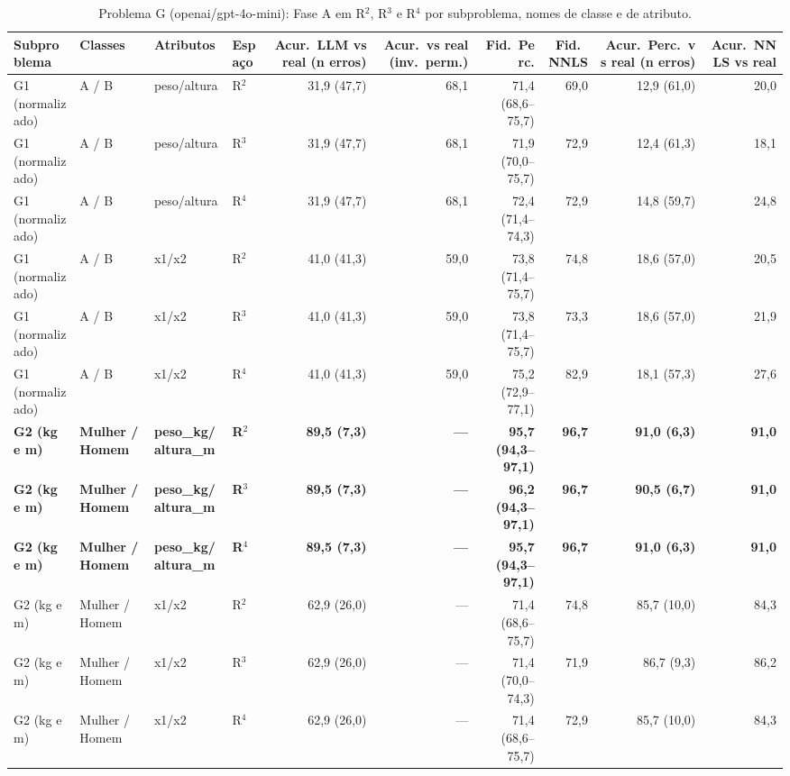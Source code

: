 \begin{table}[htbp]
\centering
\footnotesize
\caption{Problema G (openai/gpt-4o-mini): Fase A em R$^2$, R$^3$ e R$^4$ por subproblema, nomes de classe e de atributo.}
\label{tab:bloco3_G_faseA_R2_R3_R4_gpt4mini}
\begin{tabular}{llllrrrrrr}
\toprule
Subproblema & Classes & Atributos & Espaço & Acur.\ LLM vs real (n erros) & Acur.\ vs real (inv.\ perm.) & Fid.\ Perc. & Fid.\ NNLS & Acur.\ Perc.\ vs real (n erros) & Acur.\ NNLS vs real \\
\midrule
G1 (normalizado) & A / B & peso/altura & R$^2$ & 31,9 (47,7) & 68,1 & 71,4 (68,6–75,7) & 69,0 & 12,9 (61,0) & 20,0 \\
G1 (normalizado) & A / B & peso/altura & R$^3$ & 31,9 (47,7) & 68,1 & 71,9 (70,0–75,7) & 72,9 & 12,4 (61,3) & 18,1 \\
G1 (normalizado) & A / B & peso/altura & R$^4$ & 31,9 (47,7) & 68,1 & 72,4 (71,4–74,3) & 72,9 & 14,8 (59,7) & 24,8 \\
\midrule
G1 (normalizado) & A / B & x1/x2 & R$^2$ & 41,0 (41,3) & 59,0 & 73,8 (71,4–75,7) & 74,8 & 18,6 (57,0) & 20,5 \\
G1 (normalizado) & A / B & x1/x2 & R$^3$ & 41,0 (41,3) & 59,0 & 73,8 (71,4–75,7) & 73,3 & 18,6 (57,0) & 21,9 \\
G1 (normalizado) & A / B & x1/x2 & R$^4$ & 41,0 (41,3) & 59,0 & 75,2 (72,9–77,1) & 82,9 & 18,1 (57,3) & 27,6 \\
\midrule
\textbf{G2 (kg e m)} & \textbf{Mulher / Homem} & \textbf{peso\_kg/altura\_m} & \textbf{R$^2$} & \textbf{89,5 (7,3)} & \textbf{—} & \textbf{95,7 (94,3–97,1)} & \textbf{96,7} & \textbf{91,0 (6,3)} & \textbf{91,0} \\
\textbf{G2 (kg e m)} & \textbf{Mulher / Homem} & \textbf{peso\_kg/altura\_m} & \textbf{R$^3$} & \textbf{89,5 (7,3)} & \textbf{—} & \textbf{96,2 (94,3–97,1)} & \textbf{96,7} & \textbf{90,5 (6,7)} & \textbf{91,0} \\
\textbf{G2 (kg e m)} & \textbf{Mulher / Homem} & \textbf{peso\_kg/altura\_m} & \textbf{R$^4$} & \textbf{89,5 (7,3)} & \textbf{—} & \textbf{95,7 (94,3–97,1)} & \textbf{96,7} & \textbf{91,0 (6,3)} & \textbf{91,0} \\
\midrule
G2 (kg e m) & Mulher / Homem & x1/x2 & R$^2$ & 62,9 (26,0) & — & 71,4 (68,6–75,7) & 74,8 & 85,7 (10,0) & 84,3 \\
G2 (kg e m) & Mulher / Homem & x1/x2 & R$^3$ & 62,9 (26,0) & — & 71,4 (70,0–74,3) & 71,9 & 86,7 (9,3) & 86,2 \\
G2 (kg e m) & Mulher / Homem & x1/x2 & R$^4$ & 62,9 (26,0) & — & 71,4 (68,6–75,7) & 72,9 & 85,7 (10,0) & 84,3 \\

\end{tabular}
\end{table}
